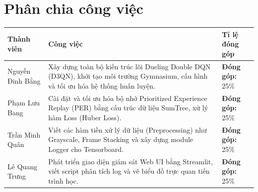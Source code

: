\section*{Phân chia công việc}
\begin{longtable}{|p{4cm}|p{8cm}|p{3cm}|}
\hline
\textbf{Thành viên} & \textbf{Công việc} & \textbf{Tỉ lệ đóng góp} \\
\hline
Nguyễn Đinh Bằng \newline
& Xây dựng toàn bộ kiến trúc lõi Dueling Double DQN (D3QN), khởi tạo môi trường Gymnasium, cấu hình và tối ưu hóa hệ thống huấn luyện.
& \textbf{Đóng góp:} 25\% \\
\hline
Phạm Lưu Bang
& Cài đặt và tối ưu hóa bộ nhớ Prioritized Experience Replay (PER) bằng cấu trúc dữ liệu SumTree, xử lý hàm Loss (Huber Loss).
& \textbf{Đóng góp:} 25\% \\
\hline
Trần Minh Quân 
& Viết các hàm tiền xử lý dữ liệu (Preprocessing) như Grayscale, Frame Stacking và xây dựng module Logger cho Tensorboard.
& \textbf{Đóng góp:} 25\% \\
\hline
Lê Quang Trưng
& Phát triển giao diện giám sát Web UI bằng Streamlit, viết script phân tích log và vẽ biểu đồ trực quan tiến trình học.
& \textbf{Đóng góp:} 25\% \\
\hline
\end{longtable}
\normalsize
